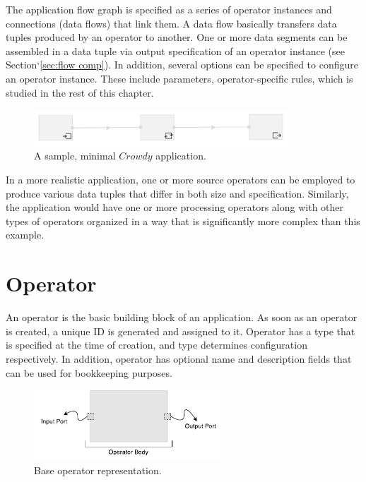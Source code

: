 The application flow graph is specified as a series of operator instances and connections 
(data flows) that link them. A data flow basically transfers data tuples 
produced by an operator to another. One or more data segments can be assembled in a 
data tuple via output specification of an operator instance (see Section`\ref{sec:flow comp}). 
In addition, several options can be specified to configure an operator instance. These 
include parameters, operator-specific rules, which is studied in the rest of this chapter.

\begin{figure}[ht]
	\centering
	\includegraphics[width=0.85\textwidth]{figures/helloworld.png}
	\caption{A sample, minimal $Crowdy$ application.}
	\label{fig:hello world}
\end{figure}

In a more realistic application, one or more source operators can be employed to produce 
various data tuples that differ in both size and specification. Similarly, the application would 
have one or more processing operators along with other types of operators organized in a way 
that is significantly more complex than this example.

\section{Operator}
An operator is the basic building block of an application. As soon as an operator is created, 
a unique ID is generated and assigned to it. Operator has a type that is specified at the time of 
creation, and type determines configuration respectively. In addition, operator has optional 
name and description fields that can be used for bookkeeping purposes.

\begin{figure}[ht]
	\centering
	\includegraphics[height=100px]{figures/basicoperator.pdf}
	\caption{Base operator representation.}
	\label{fig:basic operator}
\end{figure}

